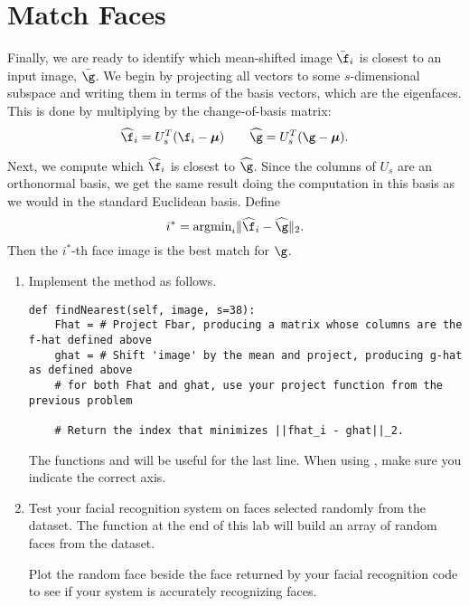\section*{Match Faces} %

Finally, we are ready to identify which mean-shifted image $\bar{\f}_i$ is closest to an input image, $\bar{\g}$.
We begin by projecting all vectors to some $s$-dimensional subspace and writing them in terms of the basis vectors, which are the eigenfaces.
This is done by multiplying by the change-of-basis matrix:
\[
\widehat{\f}_i = U_s^T(\f_i-{\boldsymbol \mu}) \qquad \widehat{\g} = U_s^T(\g-{\boldsymbol \mu}).
\]

Next, we compute which $\widehat{\f}_i$ is closest to $\widehat{\g}$.
Since the columns of $U_s$ are an orthonormal basis, we get the same result doing the computation in this basis as we would in the standard Euclidean basis.
Define
\[
i^* = \text{argmin}_i \|\widehat{\f}_i - \widehat{\g}\|_2.
\]
Then the $i^*$-th face image is the best match for $\g$.

\begin{problem}
\label{prob:nearest}
\leavevmode
\begin{enumerate}
\item
Implement the method  as follows.
\begin{lstlisting}
def findNearest(self, image, s=38):
    Fhat = # Project Fbar, producing a matrix whose columns are the f-hat defined above
    ghat = # Shift 'image' by the mean and project, producing g-hat as defined above
    # for both Fhat and ghat, use your project function from the previous problem

    # Return the index that minimizes ||fhat_i - ghat||_2.
\end{lstlisting}
The functions  and  will be useful for the last line. When using , make sure you indicate the correct axis.

\item Test your facial recognition system on faces selected randomly from the  dataset.
The function  at the end of this lab will build an array of  random faces from the  dataset.

Plot the random face beside the face returned by your facial recognition code to see if your system is accurately recognizing faces.

\end{enumerate}
\end{problem}

